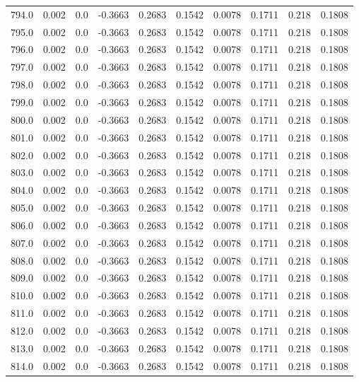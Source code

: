 \begin{longtable}{lrrrrrrrrr}
794.0 & 0.002 & 0.0 & -0.3663 & 0.2683 & 0.1542 & 0.0078 & 0.1711 & 0.218 & 0.1808 \\
795.0 & 0.002 & 0.0 & -0.3663 & 0.2683 & 0.1542 & 0.0078 & 0.1711 & 0.218 & 0.1808 \\
796.0 & 0.002 & 0.0 & -0.3663 & 0.2683 & 0.1542 & 0.0078 & 0.1711 & 0.218 & 0.1808 \\
797.0 & 0.002 & 0.0 & -0.3663 & 0.2683 & 0.1542 & 0.0078 & 0.1711 & 0.218 & 0.1808 \\
798.0 & 0.002 & 0.0 & -0.3663 & 0.2683 & 0.1542 & 0.0078 & 0.1711 & 0.218 & 0.1808 \\
799.0 & 0.002 & 0.0 & -0.3663 & 0.2683 & 0.1542 & 0.0078 & 0.1711 & 0.218 & 0.1808 \\
800.0 & 0.002 & 0.0 & -0.3663 & 0.2683 & 0.1542 & 0.0078 & 0.1711 & 0.218 & 0.1808 \\
801.0 & 0.002 & 0.0 & -0.3663 & 0.2683 & 0.1542 & 0.0078 & 0.1711 & 0.218 & 0.1808 \\
802.0 & 0.002 & 0.0 & -0.3663 & 0.2683 & 0.1542 & 0.0078 & 0.1711 & 0.218 & 0.1808 \\
803.0 & 0.002 & 0.0 & -0.3663 & 0.2683 & 0.1542 & 0.0078 & 0.1711 & 0.218 & 0.1808 \\
804.0 & 0.002 & 0.0 & -0.3663 & 0.2683 & 0.1542 & 0.0078 & 0.1711 & 0.218 & 0.1808 \\
805.0 & 0.002 & 0.0 & -0.3663 & 0.2683 & 0.1542 & 0.0078 & 0.1711 & 0.218 & 0.1808 \\
806.0 & 0.002 & 0.0 & -0.3663 & 0.2683 & 0.1542 & 0.0078 & 0.1711 & 0.218 & 0.1808 \\
807.0 & 0.002 & 0.0 & -0.3663 & 0.2683 & 0.1542 & 0.0078 & 0.1711 & 0.218 & 0.1808 \\
808.0 & 0.002 & 0.0 & -0.3663 & 0.2683 & 0.1542 & 0.0078 & 0.1711 & 0.218 & 0.1808 \\
809.0 & 0.002 & 0.0 & -0.3663 & 0.2683 & 0.1542 & 0.0078 & 0.1711 & 0.218 & 0.1808 \\
810.0 & 0.002 & 0.0 & -0.3663 & 0.2683 & 0.1542 & 0.0078 & 0.1711 & 0.218 & 0.1808 \\
811.0 & 0.002 & 0.0 & -0.3663 & 0.2683 & 0.1542 & 0.0078 & 0.1711 & 0.218 & 0.1808 \\
812.0 & 0.002 & 0.0 & -0.3663 & 0.2683 & 0.1542 & 0.0078 & 0.1711 & 0.218 & 0.1808 \\
813.0 & 0.002 & 0.0 & -0.3663 & 0.2683 & 0.1542 & 0.0078 & 0.1711 & 0.218 & 0.1808 \\
814.0 & 0.002 & 0.0 & -0.3663 & 0.2683 & 0.1542 & 0.0078 & 0.1711 & 0.218 & 0.1808 \\

\end{longtable}
